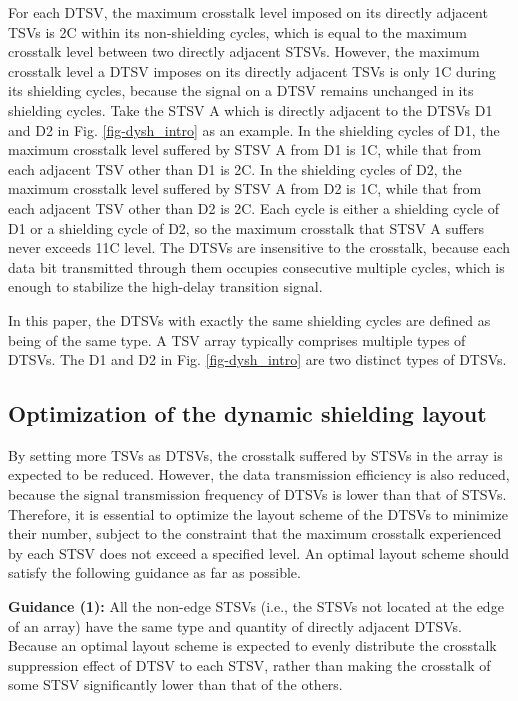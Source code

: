 \documentclass[lettersize,journal]{IEEEtran}
\begin{document}
For each DTSV, the maximum crosstalk level imposed on its directly adjacent TSVs is 2C within its non-shielding cycles, which is equal to the maximum crosstalk level between two directly adjacent STSVs. However, the maximum crosstalk level a DTSV imposes on its directly adjacent TSVs is only 1C during its shielding cycles, because the signal on a DTSV remains unchanged in its shielding cycles. Take the STSV A which is directly adjacent to the DTSVs D1 and D2 in Fig. \ref{fig-dysh_intro} as an example. In the shielding cycles of D1, the maximum crosstalk level suffered by STSV A from D1 is 1C, while that from each adjacent TSV other than D1 is 2C. In the shielding cycles of D2, the maximum crosstalk level suffered by STSV A from D2 is 1C, while that from each adjacent TSV other than D2 is 2C. Each cycle is either a shielding cycle of D1 or a shielding cycle of D2, so the maximum crosstalk that STSV A suffers never exceeds 11C level. The DTSVs are insensitive to the crosstalk, because each data bit transmitted through them occupies consecutive multiple cycles, which is enough to stabilize the high-delay transition signal.

In this paper, the DTSVs with exactly the same shielding cycles are defined as being of the same type. A TSV array typically comprises multiple types of DTSVs. The D1 and D2 in Fig. \ref{fig-dysh_intro} are two distinct types of DTSVs. 


\subsection{Optimization of the dynamic shielding layout}\label{subsec-dysh-layout}
By setting more TSVs as DTSVs, the crosstalk suffered by STSVs in the array is expected to be reduced. However, the data transmission efficiency is also reduced, because the signal transmission frequency of DTSVs is lower than that of STSVs. Therefore, it is essential to optimize the layout scheme of the DTSVs to minimize their number, subject to the constraint that the maximum crosstalk experienced by each STSV does not exceed a specified level.
An optimal layout scheme should satisfy the following guidance as far as possible.

{\bf Guidance (1):} All the non-edge STSVs (i.e., the STSVs not located at the edge of an array) have the same type and quantity of directly adjacent DTSVs. Because an optimal layout scheme is expected to evenly distribute the crosstalk suppression effect of DTSV to each STSV, rather than making the crosstalk of some STSV significantly lower than that of the others.
\end{document}
